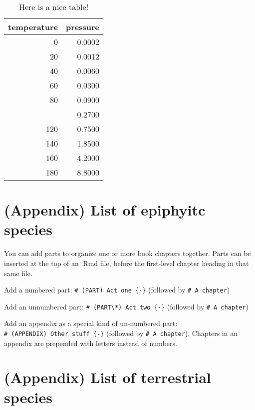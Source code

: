 \documentclass[
]{book}
\theoremstyle{definition}
\theoremstyle{definition}
\theoremstyle{definition}
\theoremstyle{definition}
\theoremstyle{remark}
\begin{document}
\begin{table}

\caption{\label{tab:nice-table}Here is a nice table!}
\centering
\begin{tabular}[t]{rr}
\toprule
temperature & pressure\\
\midrule
0 & 0.0002\\
20 & 0.0012\\
40 & 0.0060\\
60 & 0.0300\\
80 & 0.0900\\
\addlinespace
100 & 0.2700\\
120 & 0.7500\\
140 & 1.8500\\
160 & 4.2000\\
180 & 8.8000\\
\bottomrule
\end{tabular}
\end{table}

\hypertarget{appendix-list-of-epiphyitc-species}{%
\chapter*{(Appendix) List of epiphyitc species}\label{appendix-list-of-epiphyitc-species}}

You can add parts to organize one or more book chapters together. Parts can be inserted at the top of an .Rmd file, before the first-level chapter heading in that same file.

Add a numbered part: \texttt{\#\ (PART)\ Act\ one\ \{-\}} (followed by \texttt{\#\ A\ chapter})

Add an unnumbered part: \texttt{\#\ (PART\textbackslash{}*)\ Act\ two\ \{-\}} (followed by \texttt{\#\ A\ chapter})

Add an appendix as a special kind of un-numbered part: \texttt{\#\ (APPENDIX)\ Other\ stuff\ \{-\}} (followed by \texttt{\#\ A\ chapter}). Chapters in an appendix are prepended with letters instead of numbers.

\hypertarget{appendix-list-of-terrestrial-species}{%
\chapter*{(Appendix) List of terrestrial species}\label{appendix-list-of-terrestrial-species}}
\end{document}
